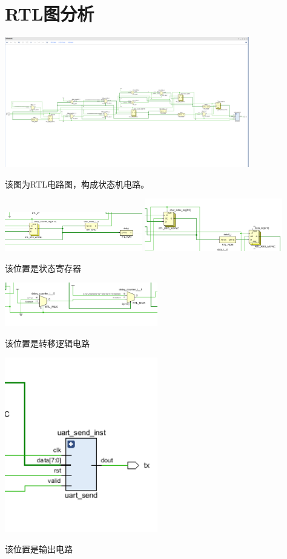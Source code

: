 \documentclass{article} %
\begin{document}
\section{RTL图分析}
\includegraphics[width=0.8\textwidth]{RTL.png}\par
该图为RTL电路图，构成状态机电路。\par
$$
$$
\includegraphics[width=0.45\textwidth]{11.png}
\includegraphics[width=0.45\textwidth]{111.png}\par
该位置是状态寄存器\par
$$
$$
\includegraphics[width=0.5\textwidth]{12.png}\par
该位置是转移逻辑电路\par
\includegraphics[width=0.5\textwidth]{13.png}\par
该位置是输出电路\par
\end{document}
